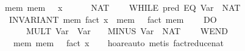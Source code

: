 \begin{isabellebody}
\ \ {}{}mem{}\ mem\ {}\ {}\ x{}\ {}\isanewline
\ \ \ {}\ {}{}\ NAT\ {}{}\isanewline
\ \ \ {}WHILE\ {}{}pred\ {}EQ\ {}Var\ {}{}\ {}NAT\ {}{}{}{}\isanewline
\ \ \ INVARIANT\ {}mem{}\ fact\ x\ {}\ mem\ {}\ {}\ fact\ {}mem\ {}{}{}\isanewline
\ \ \ DO\isanewline
\ \ \ \ \ {}\ {}{}\ MULT\ {}Var\ {}{}\ {}Var\ {}{}{}\ {}\ {}{}\ MINUS\ {}Var\ {}{}\ {}NAT\ {}{}\isanewline
\ \ \ WEND{}\isanewline
\ \ \ {}\ {}mem{}\ mem\ {}\ {}\ fact\ x{}{}\isanewline
%
\isadelimproof
\ \ %
\endisadelimproof
%
\isatagproof
{}\isamarkupfalse%
\ hoare{}auto\ {}metis\ fact{}reduce{}nat{}%
\endisatagproof
{\isafoldproof}%
%
\isadelimproof
\isanewline
%
\endisadelimproof
%
\isadelimtheory
\isanewline
%
\endisadelimtheory
%
\isatagtheory
{}\isamarkupfalse%
%
\endisatagtheory
{\isafoldtheory}%
%
\isadelimtheory
\isanewline
%
\endisadelimtheory
\end{isabellebody}%
